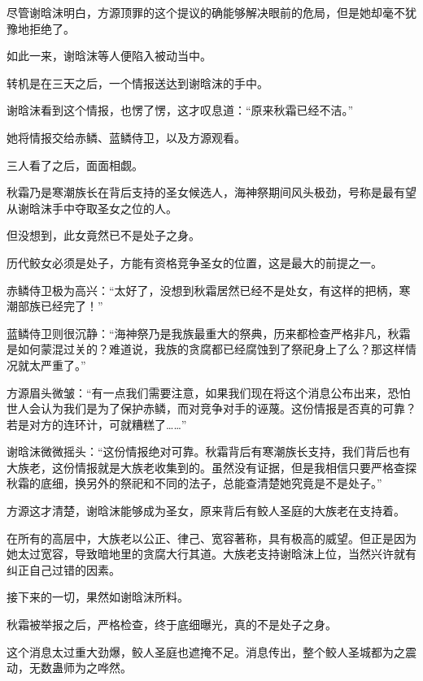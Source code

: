 
\begin{this_body}



尽管谢晗沫明白，方源顶罪的这个提议的确能够解决眼前的危局，但是她却毫不犹豫地拒绝了。

如此一来，谢晗沫等人便陷入被动当中。

转机是在三天之后，一个情报送达到谢晗沫的手中。

谢晗沫看到这个情报，也愣了愣，这才叹息道：“原来秋霜已经不洁。”

她将情报交给赤鳞、蓝鳞侍卫，以及方源观看。

三人看了之后，面面相觑。

秋霜乃是寒潮族长在背后支持的圣女候选人，海神祭期间风头极劲，号称是最有望从谢晗沫手中夺取圣女之位的人。

但没想到，此女竟然已不是处子之身。

历代鲛女必须是处子，方能有资格竞争圣女的位置，这是最大的前提之一。

赤鳞侍卫极为高兴：“太好了，没想到秋霜居然已经不是处女，有这样的把柄，寒潮部族已经完了！”

蓝鳞侍卫则很沉静：“海神祭乃是我族最重大的祭典，历来都检查严格非凡，秋霜是如何蒙混过关的？难道说，我族的贪腐都已经腐蚀到了祭祀身上了么？那这样情况就太严重了。”

方源眉头微皱：“有一点我们需要注意，如果我们现在将这个消息公布出来，恐怕世人会认为我们是为了保护赤鳞，而对竞争对手的诬蔑。这份情报是否真的可靠？若是对方的连环计，可就糟糕了……”

谢晗沫微微摇头：“这份情报绝对可靠。秋霜背后有寒潮族长支持，我们背后也有大族老，这份情报就是大族老收集到的。虽然没有证据，但是我相信只要严格查探秋霜的底细，换另外的祭祀和不同的法子，总能查清楚她究竟是不是处子。”

方源这才清楚，谢晗沫能够成为圣女，原来背后有鲛人圣庭的大族老在支持着。

在所有的高层中，大族老以公正、律己、宽容著称，具有极高的威望。但正是因为她太过宽容，导致暗地里的贪腐大行其道。大族老支持谢晗沫上位，当然兴许就有纠正自己过错的因素。

接下来的一切，果然如谢晗沫所料。

秋霜被举报之后，严格检查，终于底细曝光，真的不是处子之身。

这个消息太过重大劲爆，鲛人圣庭也遮掩不足。消息传出，整个鲛人圣城都为之震动，无数蛊师为之哗然。


\end{this_body}
